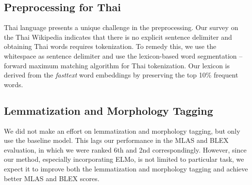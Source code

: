 \documentclass[11pt,a4paper]{article}
\begin{document}
\subsection{Preprocessing for Thai}

Thai language presents a unique challenge in the preprocessing.
Our survey on the Thai Wikipedia indicates that there is no explicit sentence delimiter 
and obtaining Thai words requires tokenization.
To remedy this, we use the whitespace as sentence delimiter and
use the lexicon-based word segmentation -- forward maximum matching algorithm
for Thai tokenization.
Our lexicon is derived from the \textit{fasttext} word embeddings by preserving the top 10\% frequent words.

\subsection{Lemmatization and Morphology Tagging}
We did not make an effort on lemmatization and morphology tagging,
but only use the baseline model.
This lags our performance in the MLAS and BLEX evaluation,
in which we were ranked 6th and 2nd correspondingly.
However, since our method, especially incorporating ELMo, is not limited to particular task,
we expect it to improve both the lemmatization and morphology tagging and
achieve better MLAS and BLEX scores.
\end{document}
